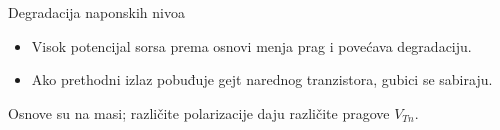 \begin{frame}[label=09_3-s054]{Degradacija naponskih nivoa}
\begin{itemize}
\item Visok potencijal sorsa prema osnovi menja prag i povećava degradaciju.
\item Ako prethodni izlaz pobuđuje gejt narednog tranzistora, gubici se sabiraju.
\end{itemize}\begin{center}

\end{center}Osnove su na masi; različite polarizacije daju različite pragove $V_{Tn}$.
\end{frame}
